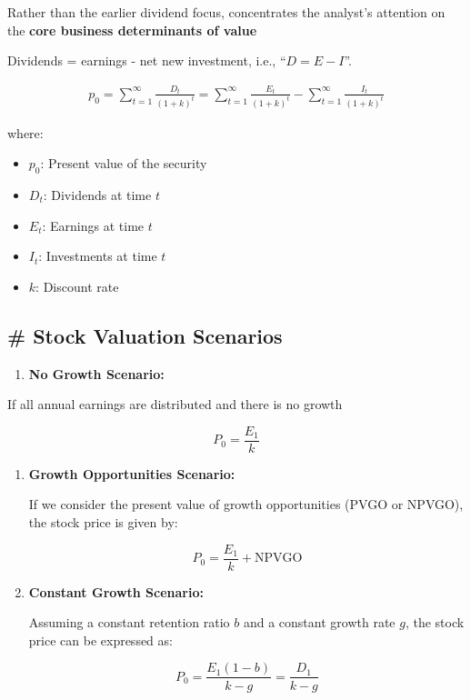 \documentclass[
]{book}
\providecommand{\tightlist}{%
  \setlength{\itemsep}{0pt}\setlength{\parskip}{0pt}}
\begin{document}
Rather than the earlier dividend focus, concentrates the analyst's
attention on the \textbf{core business determinants of value}

Dividends = earnings - net new investment, i.e., ``\(D = E - I\)''.

\[
\begin{align}
p_0 = \sum_{t=1}^{\infty} \frac{D_t}{(1+k)^t} = \sum_{t=1}^{\infty} \frac{E_t}{(1+k)^t} - \sum_{t=1}^{\infty} \frac{I_t}{(1+k)^t}
\end{align}
\]

where:

\begin{itemize}
\tightlist
\item
  \(p_0\): Present value of the security
\item
  \(D_t\): Dividends at time \(t\)
\item
  \(E_t\): Earnings at time \(t\)
\item
  \(I_t\): Investments at time \(t\)
\item
  \(k\): Discount rate
\end{itemize}

\hypertarget{stock-valuation-scenarios}{%
\subsection{\# Stock Valuation
Scenarios}\label{stock-valuation-scenarios}}

\begin{enumerate}
\def\labelenumi{\arabic{enumi}.}
\tightlist
\item
  \textbf{No Growth Scenario:}
\end{enumerate}

If all annual earnings are distributed and there is no growth

\[
   P_0 = \frac{E_1}{k}
   \]

\begin{enumerate}
\def\labelenumi{\arabic{enumi}.}
\setcounter{enumi}{1}
\item
  \textbf{Growth Opportunities Scenario:}

  If we consider the present value of growth opportunities (PVGO or
  NPVGO), the stock price is given by:

  \[
  P_0 = \frac{E_1}{k} + \text{NPVGO}
  \]
\item
  \textbf{Constant Growth Scenario:}

  Assuming a constant retention ratio \(b\) and a constant growth rate
  \(g\), the stock price can be expressed as:

  \[
  P_0 = \frac{E_1 (1 - b)}{k - g} = \frac{D_1}{k - g}
  \]
\end{enumerate}
\end{document}
